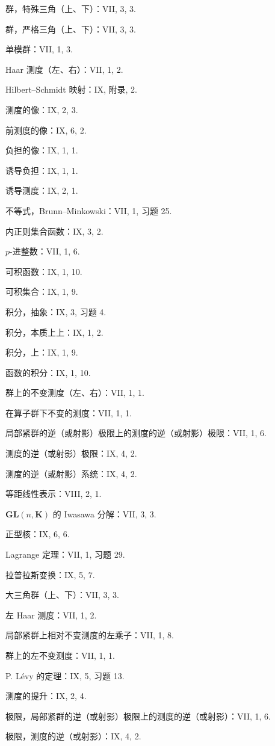 群，特殊三角（上、下）：VII, 3, 3.

群，严格三角（上、下）：VII, 3, 3.

单模群：VII, 1, 3.

Haar 测度（左、右）：VII, 1, 2.

Hilbert--Schmidt 映射：IX, 附录, 2.

测度的像：IX, 2, 3.

前测度的像：IX, 6, 2.

负担的像：IX, 1, 1.

诱导负担：IX, 1, 1.

诱导测度：IX, 2, 1.

不等式，Brunn--Minkowski：VII, 1, 习题 25.

内正则集合函数：IX, 3, 2.

\(p\)-进整数：VII, 1, 6.

可积函数：IX, 1, 10.

可积集合：IX, 1, 9.

积分，抽象：IX, 3, 习题 4.

积分，本质上上：IX, 1, 2.

积分，上：IX, 1, 9.

函数的积分：IX, 1, 10.

群上的不变测度（左、右）：VII, 1, 1.

在算子群下不变的测度：VII, 1, 1.

局部紧群的逆（或射影）极限上的测度的逆（或射影）极限：VII, 1, 6.

测度的逆（或射影）极限：IX, 4, 2.

测度的逆（或射影）系统：IX, 4, 2.

等距线性表示：VIII, 2, 1.

\(\mathbf{GL}(n,\mathbf{K})\) 的 Iwasawa 分解：VII, 3, 3.

正型核：IX, 6, 6.

Lagrange 定理：VII, 1, 习题 29.

拉普拉斯变换：IX, 5, 7.

大三角群（上、下）：VII, 3, 3.

左 Haar 测度：VII, 1, 2.

局部紧群上相对不变测度的左乘子：VII, 1, 8.

群上的左不变测度：VII, 1, 1.

P. Lévy 的定理：IX, 5, 习题 13.

测度的提升：IX, 2, 4.

极限，局部紧群的逆（或射影）极限上的测度的逆（或射影）：VII, 1, 6.

极限，测度的逆（或射影）：IX, 4, 2.

